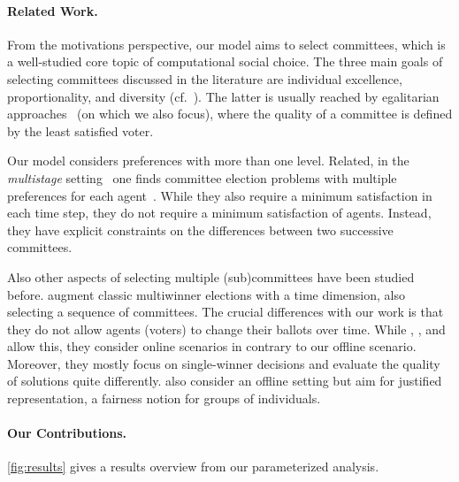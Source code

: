 \documentclass[10pt,a4paper,twocolumn]{article}
\newcommand{\tikzpreamble}{%
    \def\teps{0.075}
    \def\nsc{0.33}
    \def\tanS{1.7320508}
    \def\bsc{0.075}
    \def\colpNPh{red!85!black}
    \def\colXPWh{orange}
    \def\colFPTnoPK{green!80!black}
    \def\colFPTPK{green!40!white}
    \def\colFPT{green}
    \def\colXP{yellow}
    \def\colOpen{brown!20!white}
    \tikzstyle{xnode}=[circle,scale=\nsc,draw,fill=white];
    \tikzstyle{xnodeA}=[circle,scale=\nsc,fill=white,draw=red];
    \tikzstyle{xnodeB}=[circle,scale=\nsc,fill=lightgray,draw=green];
    \tikzstyle{xnodeC}=[circle,scale=\nsc,fill=black,draw=blue];
    \tikzstyle{xnodex}=[circle,fill,scale=\nsc,draw];
    \tikzstyle{xnodey}=[diamond,fill,scale=\nsc,draw];
    \tikzstyle{xstarL}=[star,star points=6,draw,scale=0.4];
    \tikzstyle{xstar}=[star,star points=8,draw,scale=0.4];
    \tikzstyle{xstarB}=[star,star points=10,draw,scale=0.4];
    \tikzstyle{xedge}=[thick,-];
    \tikzstyle{xedgex}=[thick,-,dashed];
    \tikzstyle{xedgedot}=[thick,-,dotted];
    
    \tikzstyle{xpath}=[color=blue,opacity=0.25,line cap=round,line width=6pt];
    \tikzstyle{xpathS}=[color=blue!40!white,opacity=0.3,line cap=round,line join=round,line width=5pt];
    \tikzstyle{xpathSx}=[color=green!40!black,opacity=0.3,line cap=round,line join=round,line width=5pt];
    \tikzstyle{xpathx}=[color=magenta,opacity=0.40,line cap=round,line width=6pt];
    \tikzstyle{xpathy}=[color=green,opacity=0.40,line cap=round,line width=6pt];
    
    \tikzstyle{xhili}=[circle,scale=1.25,opacity=0.25,fill,color=orange,draw];
    \tikzstyle{xhiliS}=[circle,scale=0.625,opacity=0.25,fill,color=orange,draw];
    \tikzstyle{xhiliIS}=[circle,scale=1.25,opacity=0.25,fill,color=magenta,draw];
    \tikzstyle{xxhiliS}=[rectangle,scale=0.85,opacity=0.25,fill,color=cyan,draw];
  }
\theoremstyle{plain}
\theoremstyle{definition}
\theoremstyle{remark}
\begin{document}
{\paragraph{Related Work.}
From the motivations perspective, our model aims to select committees,
which is a well-studied core topic of computational social choice.
The three main goals of selecting committees discussed in the literature are individual excellence, proportionality, and diversity (cf.\ \citet{EFSS17}).
The latter is usually reached by egalitarian approaches~\cite{AFGST18} (on which we also focus), where %
the quality of a committee is defined by the least satisfied voter.

Our model considers preferences with more than one level.
Related,
in the 
\emph{multistage} setting~\cite{EMS14,GuptaTW14}
one finds committee election problems 
with multiple preferences for each agent~\cite{kellerhals2021parameterized,BFK22}.
%
%
%
%
While they also require a minimum satisfaction in each time step,
%
they do not require a minimum satisfaction of agents.
Instead, they have explicit constraints on the differences between two successive committees.
%

Also other aspects of selecting multiple (sub)committees have been studied before.
\citet{BKN20} augment classic multiwinner elections with a time dimension,
also selecting a sequence of committees.
The crucial differences with our work is that they do not allow agents (voters)
to change their ballots over time.
While \citet{FZC17}, \citet{Lac20}, and \citet{PP13} allow this, they consider
online scenarios in contrary to our offline scenario.
Moreover, they mostly focus on single-winner decisions and
evaluate the quality of solutions quite differently.
\citet{BHPRT21} also consider an offline setting but aim
for justified representation, a fairness notion for groups
of individuals.
%
%
%
%

\paragraph{Our Contributions.}

\cref{fig:results} gives a results overview
from our parameterized analysis.
%
\begin{figure}[t!]\centering
\end{figure}}
\end{document}
